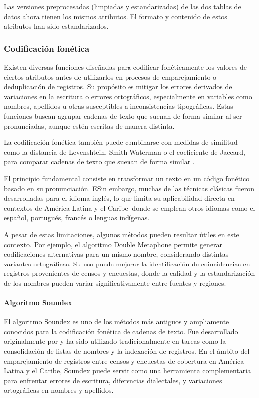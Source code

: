 \documentclass[
  12pt,
]{book}
\begin{document}
Las versiones preprocesadas (limpiadas y estandarizadas) de las dos tablas de datos ahora tienen los mismos atributos. El formato y contenido de estos atributos han sido estandarizados.

\subsubsection{Codificación fonética}\label{codificaciuxf3n-fonuxe9tica}

Existen diversas funciones diseñadas para codificar fonéticamente los valores de ciertos atributos antes de utilizarlos en procesos de emparejamiento o deduplicación de registros. Su propósito es mitigar los errores derivados de variaciones en la escritura o errores ortográficos, especialmente en variables como nombres, apellidos u otras susceptibles a inconsistencias tipográficas. Estas funciones buscan agrupar cadenas de texto que suenan de forma similar al ser pronunciadas, aunque estén escritas de manera distinta.

La codificación fonética también puede combinarse con medidas de similitud como la distancia de Levenshtein, Smith-Waterman o el coeficiente de Jaccard, para comparar cadenas de texto que suenan de forma similar \citep{navarro2001guided, nauman2022introduction}.

El principio fundamental consiste en transformar un texto en un código fonético basado en su pronunciación. ESin embargo, muchas de las técnicas clásicas fueron desarrolladas para el idioma inglés, lo que limita su aplicabilidad directa en contextos de América Latina y el Caribe, donde se emplean otros idiomas como el español, portugués, francés o lenguas indígenas.

A pesar de estas limitaciones, algunos métodos pueden resultar útiles en este contexto. Por ejemplo, el algoritmo Double Metaphone permite generar codificaciones alternativas para un mismo nombre, considerando distintas variantes ortográficas. Su uso puede mejorar la identificación de coincidencias en registros provenientes de censos y encuestas, donde la calidad y la estandarización de los nombres pueden variar significativamente entre fuentes y regiones.

\paragraph{Algoritmo Soundex}\label{algoritmo-soundex}

El algoritmo Soundex es uno de los métodos más antiguos y ampliamente conocidos para la codificación fonética de cadenas de texto. Fue desarrollado originalmente por \citep{odell1918soundex} y ha sido utilizado tradicionalmente en tareas como la consolidación de listas de nombres y la indexación de registros. En el ámbito del emparejamiento de registros entre censos y encuestas de cobertura en América Latina y el Caribe, Soundex puede servir como una herramienta complementaria para enfrentar errores de escritura, diferencias dialectales, y variaciones ortográficas en nombres y apellidos.
\end{document}
